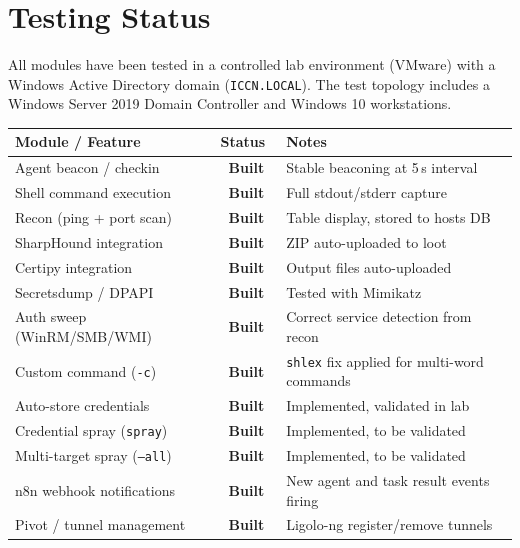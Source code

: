 \documentclass[11pt,a4paper]{article}
\newcommand{\pillbuilt}{\colorbox{bggreen}{\color{green}\bfseries\tiny\ Built\ }}
\newcommand{\theadrow}{\rowcolor{dark}\color{white}\bfseries}
\begin{document}
\section{Testing Status}

All modules have been tested in a controlled lab environment (VMware) with a Windows Active Directory domain (\texttt{ICCN.LOCAL}). The test topology includes a Windows Server 2019 Domain Controller and Windows 10 workstations.

\vspace{6pt}
\begin{tabularx}{\linewidth}{L{5cm} C{1.8cm} X}
\toprule
\theadrow Module / Feature & Status & Notes \\
\midrule
Agent beacon / checkin         & \pillbuilt    & Stable beaconing at 5\,s interval \\
Shell command execution        & \pillbuilt    & Full stdout/stderr capture \\
Recon (ping + port scan)       & \pillbuilt    & Table display, stored to hosts DB \\
SharpHound integration         & \pillbuilt    & ZIP auto-uploaded to loot \\
Certipy integration            & \pillbuilt    & Output files auto-uploaded \\
Secretsdump / DPAPI            & \pillbuilt    & Tested with Mimikatz \\
Auth sweep (WinRM/SMB/WMI)    & \pillbuilt    & Correct service detection from recon \\
Custom command (\texttt{-c})  & \pillbuilt    & \texttt{shlex} fix applied for multi-word commands \\
Auto-store credentials         & \pillbuilt    & Implemented, validated in lab \\
Credential spray (\texttt{spray}) & \pillbuilt & Implemented, to be validated \\
Multi-target spray (\texttt{--all}) & \pillbuilt & Implemented, to be validated \\
n8n webhook notifications      & \pillbuilt    & New agent and task result events firing \\
Pivot / tunnel management      & \pillbuilt    & Ligolo-ng register/remove tunnels \\
\bottomrule
\end{tabularx}
\end{document}
